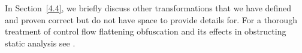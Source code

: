 \documentclass[compsoc,conference,a4paper,10pt,times]{IEEEtran}
\begin{document}
In Section~\ref{4.4}, we briefly discuss other transformations that we have defined and proven correct but do not have space to provide details for.
For a thorough treatment of control flow flattening obfuscation and its effects in obstructing static analysis see \cite{Wang}. 





\end{document}
